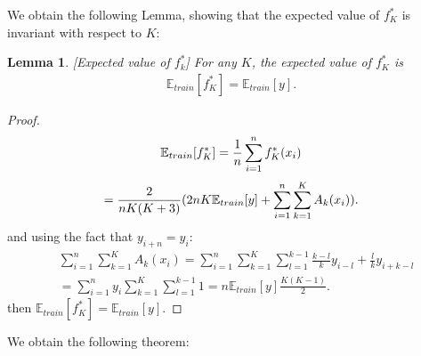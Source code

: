 \documentclass[twoside]{article}
\newtheorem{lemma}[theorem]{Lemma}
\numberwithin{intassumption}{assumption}
\begin{document}
We obtain the following Lemma, showing that the expected value of $f^*_K$ is invariant with respect to $K$:
\begin{lemma}\label{lemmaE(fk)}[Expected value of $f^*_k$] For any $K$, the expected value of $f^*_K$ is 
    \begin{align}
    \mathbb{E}_{train}[f^*_K] = \mathbb{E}_{train}[y].
\end{align}
\end{lemma}
\begin{proof}
\begin{equation*}
    \mathbb{E}_{train}[f^*_K] = \frac{1}{n}\sum_{i=1}^n f^*_K(x_i)\\
\end{equation*}
\begin{equation*}
    =\frac{2}{nK(K+3)}(2nK\mathbb{E}_{train}[y]+ \sum_{i=1}^n \sum_{k=1}^{K}A_k(x_i)). \\
\end{equation*}
and using the fact that $y_{i+n}= y_i$:
\begin{align*}
    &\sum_{i=1}^n \sum_{k=1}^{K}A_k(x_i) = \sum_{i=1}^n \sum_{k=1}^{K}\sum_{l=1}^{k-1}\frac{k-l}{k}y_{i-l}+\frac{l}{k}y_{i+k-l}\\
    &= \sum_{i=1}^n y_{i}  \sum_{k=1}^{K}\sum_{l=1}^{k-1}1
    = n\mathbb{E}_{train}[y] \frac{K(K-1)}{2}.
\end{align*}
then $\mathbb{E}_{train}[f^*_K] = \mathbb{E}_{train}[y]$.
\end{proof}

We obtain the following theorem:
\end{document}
